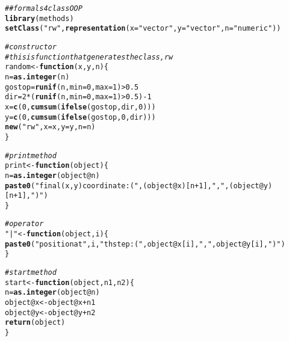 \documentclass[english]{article}\usepackage[]{graphicx}\usepackage[]{color}
\makeatletter
\newcommand{\hlnum}[1]{\textcolor[rgb]{0.686,0.059,0.569}{#1}}%
\newcommand{\hlstr}[1]{\textcolor[rgb]{0.192,0.494,0.8}{#1}}%
\newcommand{\hlcom}[1]{\textcolor[rgb]{0.678,0.584,0.686}{\textit{#1}}}%
\newcommand{\hlopt}[1]{\textcolor[rgb]{0,0,0}{#1}}%
\newcommand{\hlstd}[1]{\textcolor[rgb]{0.345,0.345,0.345}{#1}}%
\newcommand{\hlkwa}[1]{\textcolor[rgb]{0.161,0.373,0.58}{\textbf{#1}}}%
\newcommand{\hlkwb}[1]{\textcolor[rgb]{0.69,0.353,0.396}{#1}}%
\newcommand{\hlkwc}[1]{\textcolor[rgb]{0.333,0.667,0.333}{#1}}%
\newcommand{\hlkwd}[1]{\textcolor[rgb]{0.737,0.353,0.396}{\textbf{#1}}}%
\newenvironment{kframe}{%
 \def\at@end@of@kframe{}%
 \ifinner\ifhmode%
  \def\at@end@of@kframe{\end{minipage}}%
  \begin{minipage}{\columnwidth}%
 \fi\fi%
 \def\FrameCommand##1{\hskip\@totalleftmargin \hskip-\fboxsep
 \colorbox{shadecolor}{##1}\hskip-\fboxsep
     \hskip-\linewidth \hskip-\@totalleftmargin \hskip\columnwidth}%
 \MakeFramed {\advance\hsize-\width
   \@totalleftmargin\z@ \linewidth\hsize
   \@setminipage}}%
 {\par\unskip\endMakeFramed%
 \at@end@of@kframe}
\newenvironment{knitrout}{}{} %
\makeatother
\begin{document}
\begin{knitrout}
\color{fgcolor}\begin{kframe}
\begin{alltt}
\hlcom{## formal s4 class OOP}
\hlkwd{library}\hlstd{(methods)}
\hlkwd{setClass}\hlstd{(}\hlstr{"rw"}\hlstd{,}\hlkwd{representation}\hlstd{(}\hlkwc{x} \hlstd{=} \hlstr{"vector"}\hlstd{,} \hlkwc{y} \hlstd{=} \hlstr{"vector"}\hlstd{,} \hlkwc{n} \hlstd{=} \hlstr{"numeric"}\hlstd{))}

\hlcom{# constructor}
\hlcom{# this is function that generates the class, rw}
\hlstd{random} \hlkwb{<-} \hlkwa{function}\hlstd{(}\hlkwc{x}\hlstd{,} \hlkwc{y}\hlstd{,} \hlkwc{n}\hlstd{) \{}
  \hlstd{n} \hlkwb{=} \hlkwd{as.integer}\hlstd{(n)}
  \hlstd{gostop} \hlkwb{=} \hlkwd{runif}\hlstd{(n,} \hlkwc{min} \hlstd{=} \hlnum{0}\hlstd{,} \hlkwc{max} \hlstd{=} \hlnum{1}\hlstd{)} \hlopt{>} \hlnum{0.5}
  \hlstd{dir} \hlkwb{=} \hlnum{2}\hlopt{*}\hlstd{(}\hlkwd{runif}\hlstd{(n,} \hlkwc{min} \hlstd{=} \hlnum{0}\hlstd{,} \hlkwc{max} \hlstd{=} \hlnum{1}\hlstd{)} \hlopt{>} \hlnum{0.5}\hlstd{)} \hlopt{-} \hlnum{1}
  \hlstd{x} \hlkwb{=} \hlkwd{c}\hlstd{(}\hlnum{0}\hlstd{,}\hlkwd{cumsum}\hlstd{(}\hlkwd{ifelse}\hlstd{(gostop,dir,}\hlnum{0}\hlstd{)))}
  \hlstd{y} \hlkwb{=} \hlkwd{c}\hlstd{(}\hlnum{0}\hlstd{,}\hlkwd{cumsum}\hlstd{(}\hlkwd{ifelse}\hlstd{(gostop,}\hlnum{0}\hlstd{, dir)))}
  \hlkwd{new}\hlstd{(}\hlstr{"rw"}\hlstd{,} \hlkwc{x} \hlstd{= x,} \hlkwc{y} \hlstd{= y,} \hlkwc{n} \hlstd{= n)}
\hlstd{\}}

\hlcom{# print method}
\hlstd{print} \hlkwb{<-} \hlkwa{function}\hlstd{(}\hlkwc{object}\hlstd{) \{}
  \hlstd{n} \hlkwb{=} \hlkwd{as.integer}\hlstd{(object}\hlopt{@}\hlkwc{n}\hlstd{)}
  \hlkwd{paste0}\hlstd{(}\hlstr{"final (x,y) coordinate : ("}\hlstd{, (object}\hlopt{@}\hlkwc{x}\hlstd{)[n}\hlopt{+}\hlnum{1}\hlstd{],} \hlstr{","} \hlstd{, (object}\hlopt{@}\hlkwc{y}\hlstd{)[n}\hlopt{+}\hlnum{1}\hlstd{],} \hlstr{")"}\hlstd{)}
\hlstd{\}}


\hlcom{# operator}
\hlstr{"|"} \hlkwb{<-} \hlkwa{function}\hlstd{(}\hlkwc{object}\hlstd{,} \hlkwc{i}\hlstd{) \{}
  \hlkwd{paste0}\hlstd{(}\hlstr{"position at "}\hlstd{, i ,}\hlstr{"th step : ("}\hlstd{, object}\hlopt{@}\hlkwc{x}\hlstd{[i],} \hlstr{","}\hlstd{, object}\hlopt{@}\hlkwc{y}\hlstd{[i],} \hlstr{")"}\hlstd{)}
\hlstd{\}}

\hlcom{# start method}
\hlstd{start} \hlkwb{<-} \hlkwa{function}\hlstd{(}\hlkwc{object}\hlstd{,} \hlkwc{n1}\hlstd{,}\hlkwc{n2}\hlstd{) \{}
  \hlstd{n} \hlkwb{=} \hlkwd{as.integer}\hlstd{(object}\hlopt{@}\hlkwc{n}\hlstd{)}
  \hlstd{object}\hlopt{@}\hlkwc{x} \hlkwb{<-} \hlstd{object}\hlopt{@}\hlkwc{x} \hlopt{+} \hlstd{n1}
  \hlstd{object}\hlopt{@}\hlkwc{y} \hlkwb{<-} \hlstd{object}\hlopt{@}\hlkwc{y} \hlopt{+} \hlstd{n2}
  \hlkwd{return}\hlstd{(object)}
\hlstd{\}}


\end{alltt}
\end{kframe}
\end{knitrout}
\end{document}
